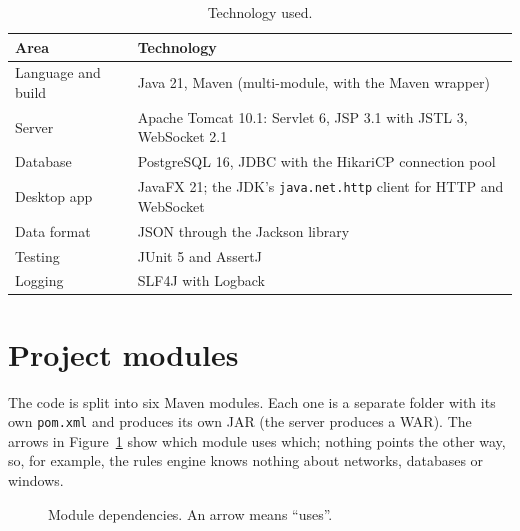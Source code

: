 \documentclass[12pt,a4paper]{article}
\newcommand{\cls}[1]{\texttt{#1}}
\begin{document}
\begin{table}[H]
\centering\small
\caption{Technology used.}
\begin{tabularx}{\textwidth}{@{}lL@{}}
\toprule
Area & Technology \\
\midrule
Language and build & Java 21, Maven (multi-module, with the Maven wrapper) \\
Server & Apache Tomcat 10.1: Servlet 6, JSP 3.1 with JSTL 3, WebSocket 2.1 \\
Database & PostgreSQL 16, JDBC with the HikariCP connection pool \\
Desktop app & JavaFX 21; the JDK's \cls{java.net.http} client for HTTP and WebSocket \\
Data format & JSON through the Jackson library \\
Testing & JUnit 5 and AssertJ \\
Logging & SLF4J with Logback \\
\bottomrule
\end{tabularx}
\end{table}

\section{Project modules}

The code is split into six Maven modules. Each one is a separate folder with its own
\cls{pom.xml} and produces its own JAR (the server produces a WAR). The arrows in
Figure~\ref{fig:modules} show which module uses which; nothing points the other way, so, for
example, the rules engine knows nothing about networks, databases or windows.

\begin{figure}[H]
\centering
{}
\caption{Module dependencies. An arrow means ``uses''.}
\label{fig:modules}
\end{figure}
\end{document}

